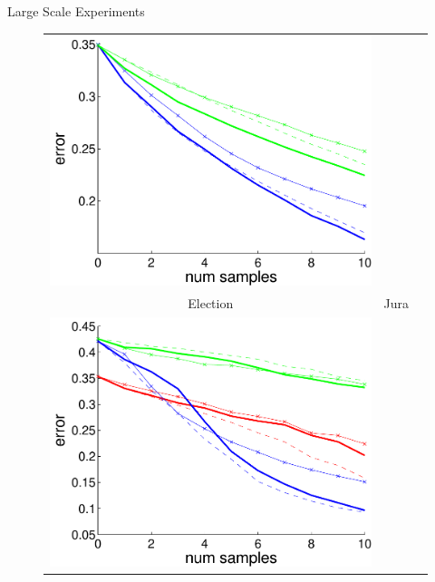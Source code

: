 \documentclass[final]{beamer}
\newlength{\onecolwid}
\begin{document}
\begin{frame}[t]
\begin{columns}[t]
\begin{column}{\onecolwid}
\begin{block}{Large Scale Experiments}
\begin{figure}[h!]
\begin{tabular}{ccc}
          \includegraphics[scale=0.75]{figs/error_movieLensDataLargeScale.pdf}\\
          Election&
          Jura&
          \\
          \includegraphics[scale=0.75]{figs/error_electionDataLargeScale.pdf}&

\end{tabular}
\end{figure}
\end{block}
\end{column}
\end{columns}
\end{frame}
\end{document}
